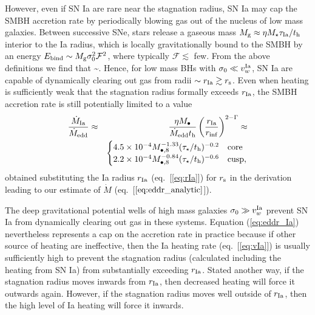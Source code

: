 \documentclass[usenatbib,fleqn]{mn2e}
\newcommand{\Mbheight}{M_{\bullet,8}}
\newcommand{\rIa}{r_{\rm Ia}}
\begin{document}
However, even if SN Ia are rare near the stagnation radius, SN Ia may
cap the SMBH accretion rate by periodically blowing gas out of the
nucleus of low mass galaxies.  Between successive SNe, stars release a
gaseous mass $M_{\rm g} \approx \eta M_{\star}\tau_{\rm Ia}/t_{\rm h}$
interior to the Ia radius, which is locally gravitationally bound to
the SMBH by an energy $E_{\rm bind} \sim M_{\rm
  g}\sigma_0^{2}\mathcal{F}^{2}$, where typically $\mathcal{F}
\lesssim$ few.  From the above definitions we find that \be
{} \sim {}.
\label{eq:blowout}
\ee
Hence, for low mass BHs with $\sigma_0 \ll v^{\rm Ia}_{w}$, SN Ia are capable of dynamically clearing out gas from radii $\sim r_{\rm Ia} \gtrsim r_{\rm s}$.  Even when heating is sufficiently weak that the stagnation radius formally exceeds $r_{\rm Ia}$, the SMBH accretion rate is still potentially limited to a value
\begin{eqnarray}
\frac{\dot{M}_{\rm Ia}}{\dot{M}_{\rm edd}} &\approx& \frac{\eta M_{\bullet}}{\dot{M}_{\rm edd} t_{\rm h}}\left(\frac{r_{\rm Ia}}{r_{\rm inf}}\right)^{2-\Gamma} \approx \nonumber \\
 && \begin{cases}
    4.5 \times 10^{-4} M_{\bullet,8}^{-1.33}(\tau_{\star}/t_{\rm h})^{-0.2}
   & \text{core} \\
    2.2 \times 10^{-4} \Mbheight^{-0.84}(\tau_{\star}/t_{\rm h})^{-0.6}   & \text{cusp},
  \end{cases}
  \label{eq:eddr_Ia}
\end{eqnarray}
obtained substituting the Ia radius $r_{\rm Ia}$ (eq.~[\ref{eq:rIa}])
for $r_{\rm s}$ in the derivation leading to our estimate of $\dot{M}$
(eq.~[$\ref{eq:eddr_analytic}$]).  

The deep gravitational potential wells of high mass galaxies $\sigma_0
\gg  v^{\rm Ia}_{w}$ prevent SN Ia from dynamically clearing out gas
in these systems.  Equation (\ref{eq:eddr_Ia}) nevertheless represents
a cap on the accretion rate in practice because if other source of
heating are ineffective, then the Ia heating rate (eq.~[\ref{eq:vIa}])
is usually sufficiently high to prevent the stagnation radius
(calculated including the heating from SN Ia) from substantially
exceeding $r_{\rm Ia}$. Stated another way, if the stagnation radius moves inwards from $\rIa$, then decreased heating will force it outwards again. However, if the stagnation radius moves well outside of $\rIa$, then the high level of Ia heating will force it inwards. 
\end{document}
